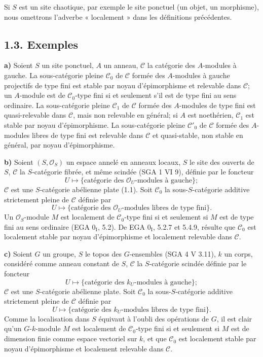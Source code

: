 \documentclass[11pt]{article}
\begin{document}
Si \(S\) est un site chaotique, par exemple le site ponctuel (un objet, un morphisme), nous omettrons l'adverbe « localement » dans les définitions précédentes.

\subsection*{1.3. Exemples}

\textbf{a)} Soient \(S\) un site ponctuel, \(A\) un anneau, \(\mathcal C\) la catégorie des \(A\)-modules à gauche. La sous-catégorie pleine \(\mathcal C_0\) de \(\mathcal C\) formée des \(A\)-modules à gauche projectifs de type fini est stable par noyau d'épimorphisme et relevable dans \(\mathcal C\); un \(A\)-module est de \(\mathcal C_0\)-type fini si et seulement s'il est de type fini au sens ordinaire. La sous-catégorie pleine \(\mathcal C_1\) de \(\mathcal C\) formée des \(A\)-modules de type fini est quasi-relevable dans \(\mathcal C\), mais non relevable en général; si \(A\) est noethérien, \(\mathcal C_1\) est stable par noyau d'épimorphisme. La sous-catégorie pleine \(\mathcal C'_0\) de \(\mathcal C\) formée des \(A\)-modules libres de type fini est relevable dans \(\mathcal C\) et quasi-stable, non stable en général, par noyau d'épimorphisme.

\textbf{b)} Soient \((S,\mathcal O_S)\) un espace annelé en anneaux locaux, \(S\) le site des ouverts de \(S\), \(\mathcal C\) la \(S\)-catégorie fibrée, et même scindée (SGA 1 VI 9), définie par le foncteur
\[
  U\longmapsto\{\text{catégorie des }\mathcal O_U\text{-modules à gauche}\};
\]
\(\mathcal C\) est une \(S\)-catégorie abélienne plate (1.1). Soit \(\mathcal C_0\) la sous-\(S\)-catégorie additive strictement pleine de \(\mathcal C\) définie par
\[
  U\longmapsto\{\text{catégorie des }\mathcal O_U\text{-modules libres de type fini}\}.
\]
Un \(\mathcal O_S\)-module \(M\) est localement de \(\mathcal C_0\)-type fini si et seulement si \(M\) est de type fini au sens ordinaire (EGA \(0_{\mathrm I}\), 5.2). De EGA \(0_{\mathrm I}\), 5.2.7 et 5.4.9, résulte que \(\mathcal C_0\) est localement stable par noyau d'épimorphisme et localement relevable dans \(\mathcal C\).

\textbf{c)} Soient \(G\) un groupe, \(S\) le topos des \(G\)-ensembles (SGA 4 V 3.11), \(k\) un corps, considéré comme anneau constant de \(S\), \(\mathcal C\) la \(S\)-catégorie scindée définie par le foncteur
\[
  U\longmapsto\{\text{catégorie des }k_U\text{-modules à gauche}\};
\]
\(\mathcal C\) est une \(S\)-catégorie abélienne plate. Soit \(\mathcal C_0\) la sous-\(S\)-catégorie additive strictement pleine de \(\mathcal C\) définie par
\[
  U\longmapsto\{\text{catégorie des }k_U\text{-modules libres de type fini}\}.
\]
Comme la localisation dans \(S\) équivaut à l'oubli des opérations de \(G\), il est clair qu'un \(G\)-\(k\)-module \(M\) est localement de \(\mathcal C_0\)-type fini si et seulement si \(M\) est de dimension finie comme espace vectoriel sur \(k\), et que \(\mathcal C_0\) est localement stable par noyau d'épimorphisme et localement relevable dans \(\mathcal C\).
\end{document}
